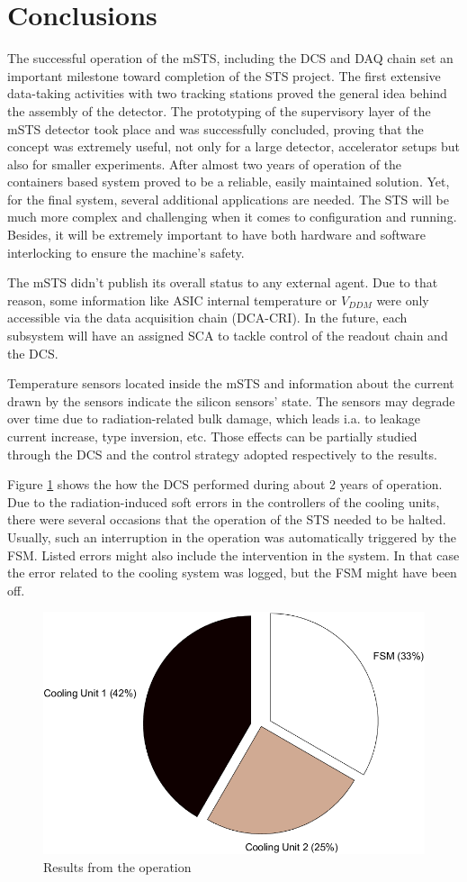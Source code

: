 \section{Conclusions}

The successful operation of the \gls{mSTS}, including the \gls{DCS} and \gls{DAQ} chain set an important milestone toward completion of the \gls{STS} project. The first extensive data-taking activities with two tracking stations proved the general idea behind the assembly of the detector. The prototyping of the supervisory layer of the \gls{mSTS} detector took place and was successfully concluded, proving that the concept was extremely useful, not only for a large detector, accelerator setups but also for smaller experiments. After almost two years of operation of the containers based system proved to be a reliable, easily maintained solution. Yet, for the final system, several additional applications are needed. The \gls{STS} will be much more complex and challenging when it comes to configuration and running. Besides, it will be extremely important to have both hardware and software interlocking to ensure the machine's safety.

The \gls{mSTS} didn't publish its overall status to any external agent. Due to that reason, some information like \gls{ASIC} internal temperature or $V_{DDM}$ were only accessible via the data acquisition chain (\gls{DCA}-\gls{CRI}). In the future, each subsystem will have an assigned \gls{SCA} to tackle control of the readout chain and the \gls{DCS}. 


Temperature sensors located inside the \gls{mSTS} and information about the current drawn by the sensors indicate the silicon sensors' state. The sensors may degrade over time due to radiation-related bulk damage,  which leads i.a. to leakage current increase, type inversion, etc. Those effects can be partially studied through the \gls{DCS} and the control strategy adopted respectively to the results.

Figure \ref{fig_dcs_results} shows the how the \gls{DCS} performed during about 2 years of operation. Due to the radiation-induced soft errors in the controllers of the cooling units, there were several occasions that the operation of the \gls{STS} needed to be halted. Usually, such an interruption in the operation was automatically triggered by the \gls{FSM}. Listed errors might also include the intervention in the system. In that case the error related to the cooling system was logged, but the FSM might have been off.
\begin{figure}[!h]
\centering
\includegraphics[width=0.55\columnwidth]{Chapter6/DCS/images/DCSpie.png}
\caption{Results from the operation}
\label{fig_dcs_results}
\end{figure}
